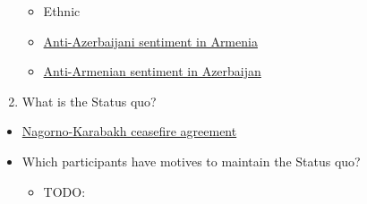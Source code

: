 \documentclass{article}
\begin{document}
\begin{enumerate}
  \begin{itemize}
  \itemsep1pt\parskip0pt
  \item
    Ethnic\\
  \item
    \href{https://en.wikipedia.org/wiki/Anti-Azerbaijani_sentiment_in_Armenia}{Anti-Azerbaijani
    sentiment in Armenia}\\
  \item
    \href{https://en.wikipedia.org/wiki/Anti-Armenian_sentiment_in_Azerbaijan}{Anti-Armenian
    sentiment in Azerbaijan}\\
  \end{itemize}
\item
  What is the Status quo?\\
\end{enumerate}

\begin{itemize}
\item
  \href{https://en.wikipedia.org/wiki/2020_Nagorno-Karabakh_ceasefire_agreement}{Nagorno-Karabakh
  ceasefire agreement}\\
\item
  Which participants have motives to maintain the Status quo?

  \begin{itemize}
  \itemsep1pt\parskip0pt
  \item
    TODO:\\
  \end{itemize}
\end{itemize}
\end{document}
